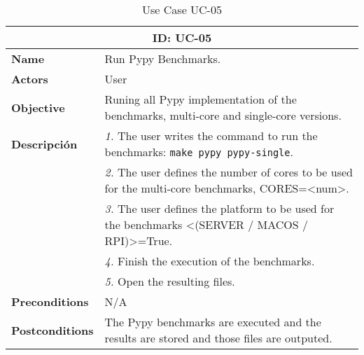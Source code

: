 \begin{table}[H]
    \centering
    \begin{tabular}{l p{10cm}}
        \toprule
        \multicolumn{2}{c}{\textbf{ID: UC-05}} \\
        \toprule
        \textbf{Name}                         &  Run Pypy Benchmarks. \\
        \textbf{Actors}                       &  User \\
        \textbf{Objective}                    &  Runing all Pypy implementation of the benchmarks, multi-core and single-core versions. \\
        \multirow{1}{*}{\textbf{Descripción}} & \textsl{1.} The user writes the command to run the benchmarks: \texttt{make pypy pypy-single}.\\
                                              & \textsl{2.} The user defines the number of cores to be used for the multi-core benchmarks, CORES=<num>.\\
                                              & \textsl{3.} The user defines the platform to be used for the benchmarks <(SERVER / MACOS / RPI)>=True.\\
                                              & \textsl{4.} Finish the execution of the benchmarks.\\
                                              & \textsl{5.} Open the resulting files.\\ 
        \textbf{Preconditions}                &  N/A \\
        \textbf{Postconditions}               &  The Pypy benchmarks are executed and the results are stored and those files are outputed. \\
    \end{tabular}
    \caption{Use Case UC-05}
    \label{tab:uc-05}
\end{table}



